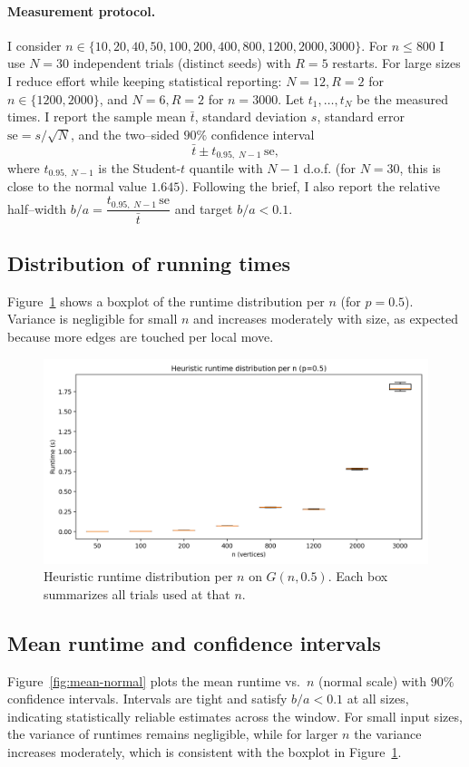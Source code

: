 \documentclass[12pt]{article}
\begin{document}
\paragraph{Measurement protocol.}
I consider \(n\in\{10,20,40,50,100,200,400,800,1200,2000,3000\}\).
For \(n\le 800\) I use \(N=30\) independent trials (distinct seeds) with \(R=5\) restarts.
For large sizes I reduce effort while keeping statistical reporting:
\(N=12, R=2\) for \(n\in\{1200,2000\}\), and \(N=6, R=2\) for \(n=3000\).
Let \(t_1,\dots,t_N\) be the measured times. I report the sample mean \(\bar t\),
standard deviation \(s\), standard error \(\mathrm{se}=s/\sqrt{N}\), and the two–sided
\(90\%\) confidence interval
\[
\bar t \pm t_{0.95,\;N-1}\,\mathrm{se},
\]
where \(t_{0.95,\;N-1}\) is the Student-\(t\) quantile with \(N-1\) d.o.f. (for \(N=30\),
this is close to the normal value \(1.645\)). Following the brief, I also report the
relative half–width \(b/a=\dfrac{t_{0.95,\;N-1}\,\mathrm{se}}{\bar t}\) and target \(b/a<0.1\).

\subsection{Distribution of running times}
Figure~\ref{fig:candle} shows a boxplot of the runtime distribution per \(n\) (for \(p=0.5\)).
Variance is negligible for small \(n\) and increases moderately with size, as expected
because more edges are touched per local move.

\begin{figure}[H]
    \centering
    \includegraphics[width=0.95\linewidth]{images/heuristic_candle_plot.png}
    \caption{Heuristic runtime distribution per \(n\) on \(G(n,0.5)\). Each box summarizes all trials used at that \(n\).}
    \label{fig:candle}
\end{figure}

\subsection{Mean runtime and confidence intervals}
Figure~\ref{fig:mean-normal} plots the mean runtime vs.\ \(n\) (normal scale) with
\(90\%\) confidence intervals. Intervals are tight and satisfy \(b/a<0.1\) at all sizes, indicating statistically reliable estimates across the window.
For small input sizes, the variance of runtimes remains negligible, while for larger \(n\) the variance increases moderately, which is consistent with the boxplot in Figure~\ref{fig:candle}.
\end{document}
